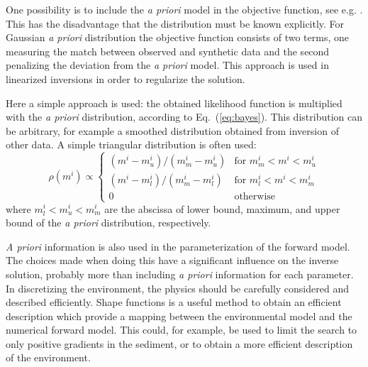 \documentclass{saclantc}
\begin{document}
One possibility is to include the {\it a priori}  model in the objective
function, see e.g. \cite{tarantola,rajan:asa92}. This has the
disadvantage that the distribution must be known explicitly. 
For Gaussian {\it a priori} distribution  the objective function
consists of two terms, one measuring the match between observed and
 synthetic data and the second 
penalizing  the deviation from the {\it a priori} model. This approach
is  used in linearized inversions in order to regularize the solution.


Here  a  simple approach is used: the obtained likelihood function
is multiplied with the {\it a priori} distribution, according to
Eq.~(\ref{eq:bayes}). This
distribution can be arbitrary, for example a smoothed distribution obtained
from inversion of other data. 
A simple triangular distribution is often used:
\begin{equation}
\rho( m^i) \propto
\left\{ 
 \begin{array}{ll}
 ({m^i - m^i_u})/({m^i_m - m^i_u})  & \mbox{for $m^i_m < m^i < m^i_u$}\\ 
 ({m^i - m^i_l})/({m^i_m - m^i_l})  & \mbox{for $m^i_l < m^i < m^i_m$}\\ 
 0 & \mbox{otherwise} 
 \end{array}
\right. 
\label{eq:apri}
\end{equation}
where $m^i_l < m^i_u < m^i_m$ are the abscissa of 
lower bound, maximum, and upper bound of the {\it a
     priori\/} distribution, respectively.

{\it A priori} information is also used in the parameterization of the
forward model. The choices made when doing this have a significant influence on
the inverse solution, probably more than including {\it a priori}
information for each parameter. In discretizing the environment, the
physics should be carefully considered and described efficiently.
Shape functions \cite{gerstoft:asa95}
is a useful method to obtain an efficient
description which provide a mapping between the environmental model
and the numerical forward model. This could, for example, be used to limit the
search to only positive gradients in the sediment, or to obtain a
more efficient description of the environment. 
\end{document}
